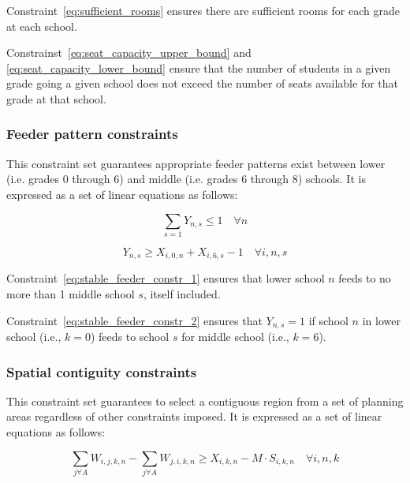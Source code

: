 \documentclass[12pt]{article}
\begin{document}
Constraint~\ref{eq:sufficient_rooms} ensures there are sufficient rooms for each grade at each school.

Constrainst~\ref{eq:seat_capacity_upper_bound} and \ref{eq:seat_capacity_lower_bound} ensure that the number of students in a given grade going a given school does not exceed the number of seats available for that grade at that school.

\subsubsection*{Feeder pattern constraints}

This constraint set guarantees appropriate feeder patterns exist between lower (i.e. grades 0 through 6) and middle (i.e. grades 6 through 8) schools. It is expressed as a set of linear equations as follows:

\begin{equation} \label{eq:stable_feeder_constr_1}
	\displaystyle\sum_{s=1} Y_{n,s} \leq 1 \quad \forall n
\end{equation}

\begin{equation} \label{eq:stable_feeder_constr_2}
	Y_{n,s} \geq X_{i,0,n} +  X_{i,6,s} - 1 \quad \forall i,n,s
\end{equation}

Constraint~\ref{eq:stable_feeder_constr_1} ensures that lower school $n$ feeds to no more than 1 middle school $s$, itself included.

Constraint~\ref{eq:stable_feeder_constr_2} ensures that $Y_{n,s}=1$ if school $n$ in lower school (i.e., $k=0$) feeds to school $s$ for middle school (i.e., $k=6$).

\subsubsection*{Spatial contiguity constraints}

This constraint set guarantees to select a contiguous region from a set of planning areas regardless of other constraints imposed. It is expressed as a set of linear equations as follows:

\begin{equation} \label{eq:net_flow}
	\displaystyle\sum_{j \forall A} W_{i,j,k,n} - \displaystyle\sum_{j \forall A} W_{j,i,k,n} \geq X_{i,k,n} - M \cdot S_{i,k,n} \quad \forall i,n,k
\end{equation}
\end{document}
